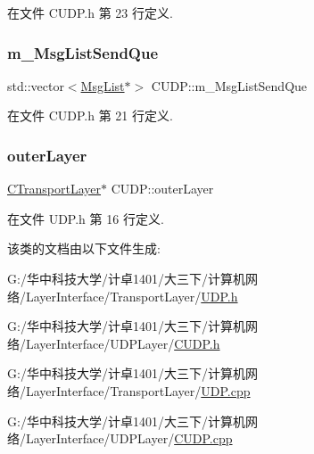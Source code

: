 在文件 C\+U\+D\+P.\+h 第 23 行定义.

\mbox{\label{class_c_u_d_p_adc6c3097ec9ab885987b058ef3b1e26f}} 
\subsubsection{\texorpdfstring{m\+\_\+\+Msg\+List\+Send\+Que}{m\_MsgListSendQue}}
{\footnotesize\ttfamily std\+::vector$<$\hyperlink{class_msg_list}{Msg\+List}$\ast$$>$ C\+U\+D\+P\+::m\+\_\+\+Msg\+List\+Send\+Que\hspace{0.3cm}{\ttfamily [protected]}}



在文件 C\+U\+D\+P.\+h 第 21 行定义.

\mbox{\label{class_c_u_d_p_a4c0a9bc6c679d857a3461a3a71ba8abd}} 
\subsubsection{\texorpdfstring{outer\+Layer}{outerLayer}}
{\footnotesize\ttfamily \hyperlink{class_c_transport_layer}{C\+Transport\+Layer}$\ast$ C\+U\+D\+P\+::outer\+Layer}



在文件 U\+D\+P.\+h 第 16 行定义.



该类的文档由以下文件生成\+:\begin{DoxyCompactItemize}
\item 
G\+:/华中科技大学/计卓1401/大三下/计算机网络/\+Layer\+Interface/\+Transport\+Layer/\hyperlink{_u_d_p_8h}{U\+D\+P.\+h}\item 
G\+:/华中科技大学/计卓1401/大三下/计算机网络/\+Layer\+Interface/\+U\+D\+P\+Layer/\hyperlink{_c_u_d_p_8h}{C\+U\+D\+P.\+h}\item 
G\+:/华中科技大学/计卓1401/大三下/计算机网络/\+Layer\+Interface/\+Transport\+Layer/\hyperlink{_u_d_p_8cpp}{U\+D\+P.\+cpp}\item 
G\+:/华中科技大学/计卓1401/大三下/计算机网络/\+Layer\+Interface/\+U\+D\+P\+Layer/\hyperlink{_c_u_d_p_8cpp}{C\+U\+D\+P.\+cpp}\end{DoxyCompactItemize}
